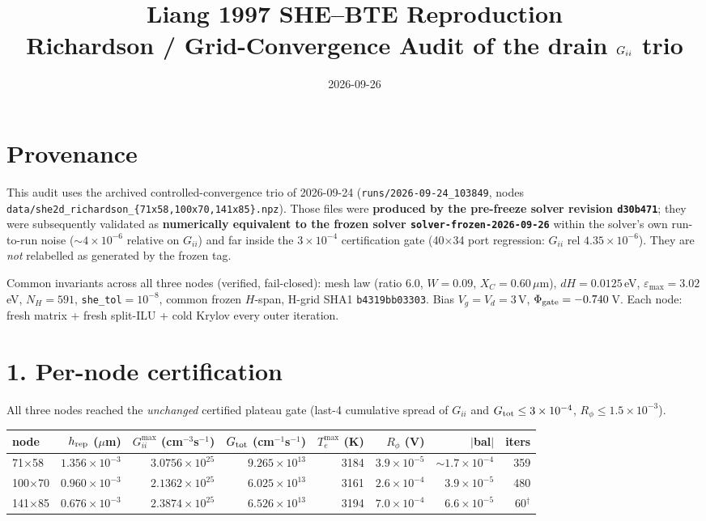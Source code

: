 \documentclass[11pt]{article}
\title{Liang 1997 SHE--BTE Reproduction\\[3pt]
\large Richardson / Grid-Convergence Audit of the drain $\Gii$ trio}
\author{}
\date{2026-09-26}
\newcommand{\ten}[1]{\times 10^{#1}}
\newcommand{\Gii}{G_{ii}}
\begin{document}
\maketitle
\vspace{-3em}

\section*{Provenance}
This audit uses the archived controlled-convergence trio of 2026-09-24
(\texttt{runs/2026-09-24\_103849}, nodes \texttt{data/she2d\_richardson\_\{71x58,100x70,141x85\}.npz}).
Those files were \textbf{produced by the pre-freeze solver revision \texttt{d30b471}}; they were
subsequently validated as \textbf{numerically equivalent to the frozen solver
\texttt{solver-frozen-2026-09-26}} within the solver's own run-to-run noise ($\sim\!4\ten{-6}$
relative on $\Gii$) and far inside the $3\ten{-4}$ certification gate (40$\times$34 port regression:
$\Gii$ rel $4.35\ten{-6}$). They are \emph{not} relabelled as generated by the frozen tag.

Common invariants across all three nodes (verified, fail-closed): mesh law
(ratio 6.0, $W=0.09$, $X_C=0.60$\,$\mu$m), $dH=0.0125$\,eV, $\varepsilon_{\max}=3.02$\,eV,
$N_H=591$, \texttt{she\_tol}$=10^{-8}$, common frozen $H$-span, H-grid SHA1 \texttt{b4319bb03303}.
Bias $V_g{=}V_d{=}3$\,V, $\Phi_{\rm gate}={-}0.740$\,V. Each node: fresh matrix + fresh split-ILU +
cold Krylov every outer iteration.

\section*{1. Per-node certification}
All three nodes reached the \emph{unchanged} certified plateau gate
(last-4 cumulative spread of $\Gii$ and $G_{\rm tot}\le3\ten{-4}$, $R_\phi\le1.5\ten{-3}$).
\begin{table}[h]\centering\renewcommand{\arraystretch}{1.15}
\begin{tabular}{@{}l r r r r r r r@{}}
\toprule
node & $h_{\rm rep}$ ($\mu$m) & $\Gii^{\max}$ (cm$^{-3}$s$^{-1}$) & $G_{\rm tot}$ (cm$^{-1}$s$^{-1}$) & $T_e^{\max}$ (K) & $R_\phi$ (V) & $|$bal$|$ & iters\\
\midrule
71$\times$58  & $1.356\ten{-3}$ & $3.0756\ten{25}$ & $9.265\ten{13}$ & 3184 & $3.9\ten{-5}$ & $\sim\!1.7\ten{-4}$ & 359\\
100$\times$70 & $0.960\ten{-3}$ & $2.1362\ten{25}$ & $6.025\ten{13}$ & 3161 & $2.6\ten{-4}$ & $3.9\ten{-5}$ & 480\\
141$\times$85 & $0.676\ten{-3}$ & $2.3874\ten{25}$ & $6.526\ten{13}$ & 3194 & $7.0\ten{-4}$ & $6.6\ten{-5}$ & 60$^\dagger$\\
\bottomrule
\end{tabular}
\end{table}
\end{document}
